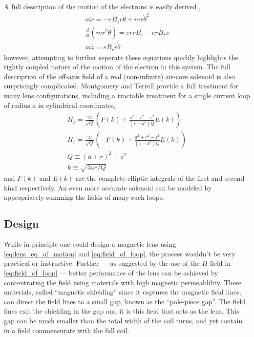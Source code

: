 A full description of the motion of the electrons is easily derived \cite{el-kareh_electron_1970},
\begin{subequations} \label{eq:lens_eq_of_motion}
\begin{gather}
  m \ddot{r} = -e B_z r \dot{\theta} + m r \dot{\theta}^2                 \\
  \frac{d}{dt} ( m r^2 \dot{\theta} ) = e r \dot{r} B_z - e r B_r \dot{z} \\
  m \ddot{z} = e B_r r \dot{\theta}
\end{gather}
\end{subequations}
however, attempting to further seperate these equations quickly highlights the tightly coupled nature of the motion of the electron in this system.
The full description of the off-axis field of a real (non-infinite) air-core solenoid is also surprisingly complicated.
Montgomery and Terrell \cite{montgomery_some_1961} provide a full treatment for many lens configurations, including a tractable treatment for a single current loop of radius $a$ in cylindrical coordinates, 
\begin{subequations} \label{eq:field_of_loop}
\begin{gather}
  H_z = \frac{2I}{\sqrt{Q}} \left(   F(k) + \frac{ a^2 - r^2 - z^2 }{ (1-k^2) Q } E(k) \right) \\
  H_r = \frac{2I}{\sqrt{Q}} \left( - F(k) + \frac{ a^2 + r^2 + z^2 }{ (1-k^2) Q } E(k) \right) \\
  Q \equiv (a+r)^2 + z^2 \\
  k \equiv \sqrt{ 4 a r / Q }
\end{gather}
\end{subequations}
and $F(k)$ and $E(k)$ are the complete elliptic integrals of the first and second kind respectively.
An even more accurate solenoid can be modeled by appropriately summing the fields of many such loops. 

\subsection{Design}

While in principle one could design a magnetic lens using \ref{eq:lens_eq_of_motion} and \ref{eq:field_of_loop}, the process wouldn't be very practical or instructive.
Further --- as suggested by the use of the $H$ field in \ref{eq:field_of_loop} --- better performance of the lens can be achieved by concentrating the field using materials with high magnetic permeablility.
These materials, called ``magnetic shielding'' since it captures the magnetic field lines, can direct the field lines to a small gap, known as the ``pole-piece gap''.
The field lines exit the shielding in the gap and it is this field that acts as the lens.
This gap can be much smaller than the total width of the coil turns, and yet contain in a field commensurate with the full coil.

